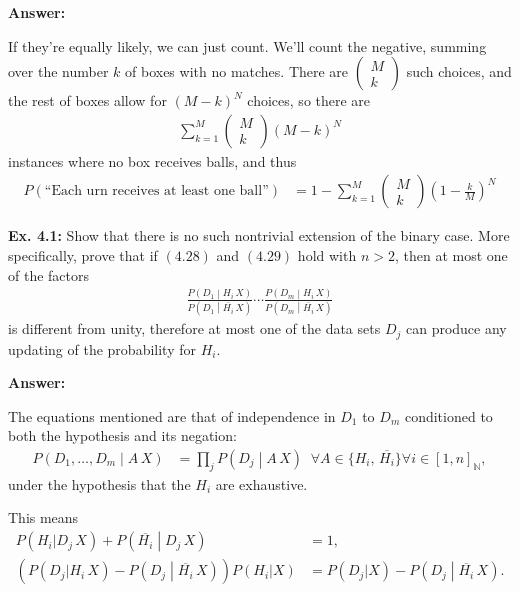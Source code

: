 \documentclass{article}
\begin{document}
\textbf{Answer: }

If they're equally likely, we can just count. We'll count the negative, summing over the number $k$ of boxes with no matches. There are $\begin{pmatrix}M\\k\end{pmatrix}$ such choices, and the rest of boxes allow for $(M-k)^N$ choices, so there are
\begin{align}
	\sum_{k=1}^M\begin{pmatrix}M\\k\end{pmatrix}(M-k)^N
\end{align}
instances where no box receives balls, and thus
\begin{align}
	P(\text{``Each urn receives at least one ball''})&=1-\sum_{k=1}^M\begin{pmatrix}M\\k\end{pmatrix}\left(1-\frac{k}{M}\right)^N
\end{align}

\textbf{Ex. 4.1: }Show that there is no such nontrivial extension of the binary case. More specifically, prove that if $(4.28)$ and $(4.29)$ hold with $n>2$, then at most one of the factors
\begin{align*}
	\frac{P\left(D_1\middle|H_i\,X\right)}{P\left(D_1\middle|\overline{H_i}\,X\right)}\cdots\frac{P\left(D_m\middle|H_i\,X\right)}{P\left(D_m\middle|\overline{H_i}\,X\right)}
\end{align*}
is different from unity, therefore at most one of the data sets $D_j$ can produce any updating of the probability for $H_i$.

\textbf{Answer:}

The equations mentioned are that of independence in $D_1$ to $D_m$ conditioned to both the hypothesis and its negation:
\begin{align*}
	P\left(D_1,\ldots,D_m\middle|A\,X\right)&=\prod_jP\left(D_j\middle|A\,X\right)\;\;\forall A\in\{H_i,\,\overline{H_i}\}\forall i\in[1,n]_{\mathbb N},
\end{align*}
under the hypothesis that the $H_i$ are exhaustive.

This means
\begin{align*}
	P(H_i|D_j\,X)+P\left(\overline{H_i}\middle|D_j\,X\right)&=1,\\
	\left(P(D_j|H_i\,X)-P\left(D_j\middle|\overline{H_i}\,X\right)\right)P(H_i|X)&=P(D_j|X)-P\left(D_j\middle|\overline{H_i}\,X\right).
\end{align*}
\end{document}
